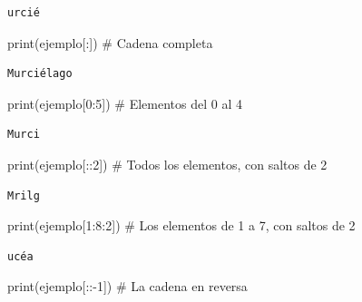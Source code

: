 \documentclass[
  spanish,
  letterpaper,
]{scrbook}
\newenvironment{Shaded}{\begin{snugshade}}{\end{snugshade}}
\newcommand{\BuiltInTok}[1]{\textcolor[rgb]{0.00,0.23,0.31}{#1}}
\newcommand{\CommentTok}[1]{\textcolor[rgb]{0.37,0.37,0.37}{#1}}
\newcommand{\DecValTok}[1]{\textcolor[rgb]{0.68,0.00,0.00}{#1}}
\newcommand{\NormalTok}[1]{\textcolor[rgb]{0.00,0.23,0.31}{#1}}
\newcommand{\OperatorTok}[1]{\textcolor[rgb]{0.37,0.37,0.37}{#1}}
\theoremstyle{definition}
\theoremstyle{remark}
\begin{document}
\begin{verbatim}
urcié
\end{verbatim}

\begin{Shaded}
\begin{Highlighting}[]
\BuiltInTok{print}\NormalTok{(ejemplo[:]) }\CommentTok{\# Cadena completa}
\end{Highlighting}
\end{Shaded}

\begin{verbatim}
Murciélago
\end{verbatim}

\begin{Shaded}
\begin{Highlighting}[]
\BuiltInTok{print}\NormalTok{(ejemplo[}\DecValTok{0}\NormalTok{:}\DecValTok{5}\NormalTok{]) }\CommentTok{\# Elementos del 0 al 4 }
\end{Highlighting}
\end{Shaded}

\begin{verbatim}
Murci
\end{verbatim}

\begin{Shaded}
\begin{Highlighting}[]
\BuiltInTok{print}\NormalTok{(ejemplo[::}\DecValTok{2}\NormalTok{]) }\CommentTok{\# Todos los elementos, con saltos de 2}
\end{Highlighting}
\end{Shaded}

\begin{verbatim}
Mrilg
\end{verbatim}

\begin{Shaded}
\begin{Highlighting}[]
\BuiltInTok{print}\NormalTok{(ejemplo[}\DecValTok{1}\NormalTok{:}\DecValTok{8}\NormalTok{:}\DecValTok{2}\NormalTok{]) }\CommentTok{\# Los elementos de 1 a 7, con saltos de 2}
\end{Highlighting}
\end{Shaded}

\begin{verbatim}
ucéa
\end{verbatim}

\begin{Shaded}
\begin{Highlighting}[]
\BuiltInTok{print}\NormalTok{(ejemplo[::}\OperatorTok{{-}}\DecValTok{1}\NormalTok{]) }\CommentTok{\# La cadena en reversa}
\end{Highlighting}
\end{Shaded}
\end{document}
